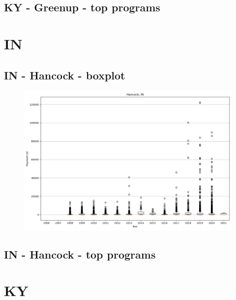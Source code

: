 \subsection*{KY - Greenup - top programs}

\newpage
\section*{IN}
\subsection*{IN - Hancock - boxplot}
\begin{figure}[h]
\centering
\includegraphics[width=7in]{../output/boxplots/counties/Hancock-IN_boxplot.png}
\end{figure}


\subsection*{IN - Hancock - top programs}

\newpage
\section*{KY}
